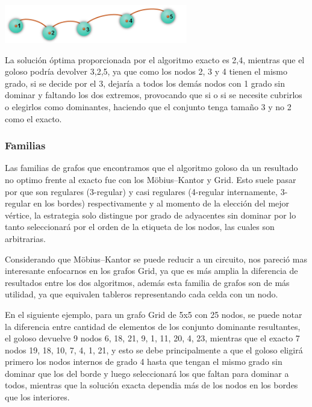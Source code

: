\begin {center}
\includegraphics[width=8cm]{./graficos/grafo_camino.png}
\end {center} 
La solución óptima proporcionada por el algoritmo exacto es {2,4}, mientras que el goloso podría devolver {3,2,5}, ya que como los nodos 2, 3 y 4 tienen el mismo grado, si se decide por el 3, dejaría a todos los demás nodos con 1 grado sin dominar y faltando los dos extremos, provocando que si o si se necesite cubrirlos o elegirlos como dominantes, haciendo que el conjunto tenga tamaño 3 y no 2 como el exacto.

\subsubsection {Familias}
Las familias de grafos que encontramos que el algoritmo goloso da un resultado no optimo frente al exacto fue con los Möbius–Kantor y Grid. Esto suele pasar por que son regulares (3-regular) y casi regulares (4-regular internamente, 3-regular en los bordes) respectivamente y al momento de la elección del mejor vértice, la estrategia solo distingue por grado de adyacentes sin dominar por lo tanto seleccionará por el orden de la etiqueta de los nodos, las cuales son arbitrarias. 

Considerando que Möbius–Kantor se puede reducir a un circuito, nos pareció mas interesante enfocarnos en los grafos Grid, ya que es más amplia la diferencia de resultados entre los dos algoritmos, además esta familia de grafos son de más utilidad, ya que equivalen tableros representando cada celda con un nodo.

En el siguiente ejemplo, para un grafo Grid de 5x5 con 25 nodos, se puede notar la diferencia entre cantidad de elementos de los conjunto dominante resultantes, el goloso devuelve 9 nodos {6, 18, 21, 9, 1, 11, 20, 4, 23}, mientras que el exacto 7 nodos {19, 18, 10, 7, 4, 1, 21}, y esto se debe principalmente a que el goloso eligirá primero los nodos internos de grado 4 hasta que tengan el mismo grado sin dominar que los del borde y luego seleccionará los que faltan para dominar a todos, mientras que la solución exacta dependia más de los nodos en los bordes que los interiores.
 
